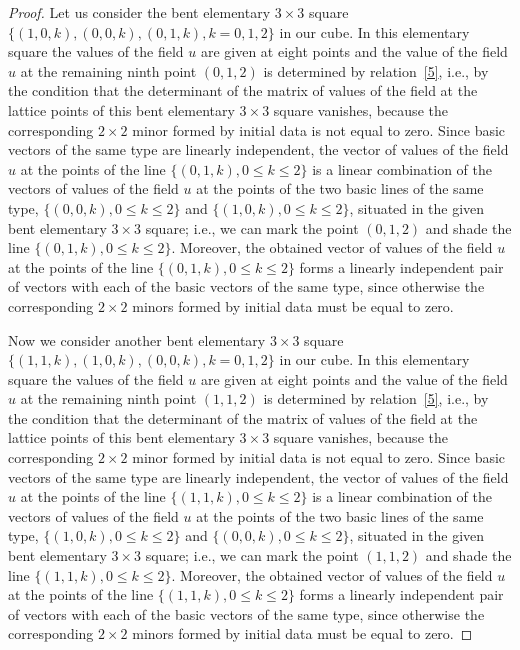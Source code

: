 \documentclass[pdftex]{sigma}
\begin{document}
\begin{proof}
Let us consider the bent elementary $3 \times 3$ square $\{(1, 0,
k), (0, 0, k), (0, 1, k), k = 0, 1, 2\}$ in our cube. In this
elementary square the values of the f\/ield $u$ are given at eight
points and the value of the f\/ield $u$ at the remaining ninth point
$(0, 1, 2)$ is determined by relation~\eqref{5}, i.e., by the
condition that the determinant of the matrix of values of the f\/ield
at the lattice points of this bent elementary $3 \times 3$ square
vanishes, because the corresponding $2 \times 2$ minor formed by
initial data is not equal to zero. Since basic vectors of the same
type are linearly independent, the vector of values of the f\/ield $u$
at the points of the line $\{(0, 1, k), 0 \leq k \leq 2\}$ is a
linear combination of the vectors of values of the f\/ield $u$ at the
points of the two basic lines of the same type, $\{(0, 0, k), 0 \leq
k \leq 2\}$ and $\{(1, 0, k), 0 \leq k \leq 2\}$, situated in the
given bent elementary $3 \times 3$ square; i.e., we can mark the
point $(0, 1, 2)$ and shade the line $\{(0, 1, k), 0 \leq k \leq
2\}$. Moreover, the obtained vector of values of the f\/ield $u$ at
the points of the line $\{(0, 1, k), 0 \leq k \leq 2\}$ forms a
linearly independent pair of vectors with each of the basic vectors
of the same type, since otherwise the corresponding $2 \times 2$
minors formed by initial data must be equal to zero.




Now we consider another bent elementary $3 \times 3$ square $\{(1,
1, k), (1, 0, k), (0, 0, k), k = 0, 1, 2\}$ in our cube. In this
elementary square the values of the f\/ield $u$ are given at eight
points and the value of the f\/ield $u$ at the remaining ninth point
$(1, 1, 2)$ is determined by relation~\eqref{5}, i.e., by the
condition that the determinant of the matrix of values of the f\/ield
at the lattice points of this bent elementary $3 \times 3$ square
vanishes, because the corresponding $2 \times 2$ minor formed by
initial data is not equal to zero. Since basic vectors of the same
type are linearly independent, the vector of values of the f\/ield $u$
at the points of the line $\{(1, 1, k), 0 \leq k \leq 2\}$ is a
linear combination of the vectors of values of the f\/ield $u$ at the
points of the two basic lines of the same type, $\{(1, 0, k), 0 \leq
k \leq 2\}$ and $\{(0, 0, k), 0 \leq k \leq 2\}$, situated in the
given bent elementary $3 \times 3$ square; i.e., we can mark the
point $(1, 1, 2)$ and shade the line $\{(1, 1, k), 0 \leq k \leq
2\}$. Moreover, the obtained vector of values of the f\/ield $u$ at
the points of the line $\{(1, 1, k), 0 \leq k \leq 2\}$ forms a
linearly independent pair of vectors with each of the basic vectors
of the same type, since otherwise the corresponding $2 \times 2$
minors formed by initial data must be equal to zero.





\end{proof}
\end{document}
